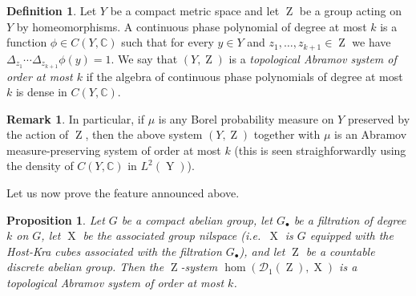 \documentclass[a4paper,12pt,reqno]{amsart}
\newtheorem{proposition}[theorem]{Proposition}
\theoremstyle{definition}
\newtheorem{defn}[theorem]{Definition}
\newtheorem{remark}[theorem]{Remark}
\newcommand{\mc}{\mathcal}
\newcommand{\mb}{\mathbb}
\DeclareMathOperator{\ab}{Z}
\DeclareMathOperator{\ns}{X}
\DeclareMathOperator{\nss}{Y}
\begin{document}
\begin{defn}\label{def:top-abramov}
Let $Y$ be a compact metric space and let $\ab$ be a group acting on $Y$ by homeomorphisms. A continuous phase polynomial of degree at most $k$ is a  function $\phi\in C(Y,\mb{C})$ such that for every $y\in Y$ and $z_1,\ldots,z_{k+1}\in \ab$ we have $\Delta_{z_1}\cdots \Delta_{z_{k+1}} \phi(y) = 1$. We say that $(Y,\ab)$ is a \emph{topological Abramov system of order at most $k$} if the algebra of continuous phase polynomials of degree at most $k$ is dense in $C(Y,\mb{C})$.
\end{defn}

\begin{remark}
In particular, if $\mu$ is any Borel probability measure on $Y$ preserved by the action of $\ab$, then the above system $(Y,\ab)$ together with $\mu$ is an Abramov measure-preserving system of order at most $k$ (this is seen straighforwardly using the density of $C(Y,\mb{C})$ in $L^2(\nss)$).
\end{remark}

Let us now prove the feature announced above.

\begin{proposition}\label{prop:top-abr}
Let $G$ be a compact abelian group, let $G_\bullet$ be a filtration of degree $k$ on $G$, let $\ns$ be the associated group nilspace \textup{(}i.e.\ $\ns$ is $G$ equipped with the Host-Kra cubes associated with the filtration $G_\bullet$\textup{)}, and let $\ab$ be a countable discrete abelian group. Then the $\ab$-system  $\hom(\mc{D}_1(\ab),\ns)$ is a topological Abramov system of order at most $k$.
\end{proposition}
\end{document}
